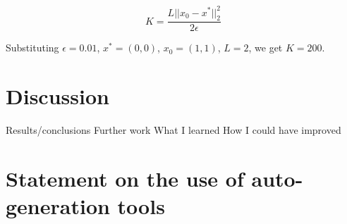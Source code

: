 \documentclass[12pt]{article}
\begin{document}
\[K = \frac{L||x_0-x^*||_2^2}{2\epsilon}\]

Substituting $\epsilon=0.01$, $x^*=(0,0)$, $x_0=(1,1)$, $L=2$, we get $K=200$.

\section{Discussion}
Results/conclusions
Further work
What I learned
How I could have improved \cite{keypaper}




\appendix

\section{Statement on the use of auto-generation tools}
\end{document}
